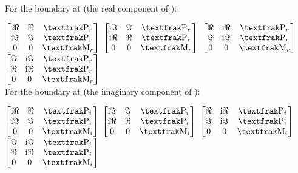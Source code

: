 \documentclass[preprint]{iucr}              %
\numberwithin{equation}{section}
\begin{document}
	
	For the boundary at \siii{} (the real component of \ciii{}):
	
	$\begin{bmatrix}
		
		\textrm{i}\Re{}	& \Re{}	& \Plus{}_r \\
		\textrm{i}\Im{}	& \Im{}	& \Plus{}_r  \\
		0				& 0		& \Minus{}_r  \\
	\end{bmatrix}$
	$\begin{bmatrix}
		\textrm{i}\Im{}	&  \Im{}	& \Plus{}_r \\
		\textrm{i}\Re{}	& \Re{}		& \Plus{}_r \\
		0				& 0			& \Minus{}_r \\
	\end{bmatrix}$ 
	$\begin{bmatrix}
		\Re{}	&   \textrm{i}\Re{}	&\Plus{}_r \\
		\Im{}	& \textrm{i}\Im{}	&\Plus{}_r \\
		0 		&  0				& \Minus{}_r \\
	\end{bmatrix}	$ 
	$\begin{bmatrix}
		\Im{}	& \textrm{i}\Im{}	& \Plus{}_r \\
		\Re{}	&  \textrm{i}\Re{}	& \Plus{}_r \\
		0		&  0				&\Minus{}_r \\
	\end{bmatrix}$ \\
	
	
	For the boundary at \svi{} (the imaginary component of \ciii{}):
	
	$\begin{bmatrix}
		
		\textrm{i}\Re{}	& \Re{}	& \Plus{}_i \\
		\textrm{i}\Im{}	& \Im{}	& \Plus{}_i \\
		0				& 0		& \Minus{}_i 
	\end{bmatrix}$
	$\begin{bmatrix}
		\textrm{i}\Im{}	&  \Im{}	& \Plus{}_i \\
		\textrm{i}\Re{}	& \Re{}		& \Plus{}_i \\
		0				& 0			& \Minus{}_i \\
	\end{bmatrix}$ 
	$\begin{bmatrix}
		\Re{}	&   \textrm{i}\Re{} &\Plus{}_i \\
		\Im{}	& \textrm{i}\Im{}	&\Plus{}_i \\
		0		&  0				& \Minus{}_i \\
	\end{bmatrix}	$ 
	$\begin{bmatrix}
		\Im{}	& \textrm{i}\Im{}	& \Plus{}_i \\
		\Re{}	&  \textrm{i}\Re{}	& \Plus{}_i \\
		0		&  0				&\Minus{}_i 
	\end{bmatrix}$ \\
	
\end{document}
